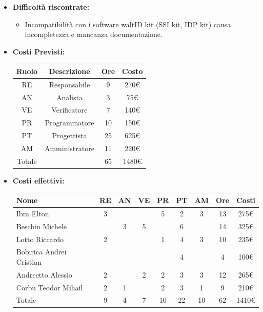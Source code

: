 \begin{itemize}
\begin{itemize}
        \end{itemize}
        \item \textbf{Difficoltà riscontrate:}
        \begin{itemize}
            \item Incompatibilità con i software waltID kit (SSI kit, IDP kit) causa incompletezza e mancanza documentazione.
        \end{itemize}
        \item \textbf{Costi Previsti:}
        \begin{longtable}{|c|c|c|c|}
            \hline
            Ruolo & Descrizione & Ore & Costo \\
            \hline
            RE & Responsabile & 9 & 270€\\
            \hline
            AN & Analista & 3 &  75€\\
            \hline
            VE & Verificatore & 7 &  140€\\
            \hline
            PR & Programmatore & 10 & 150€ \\
            \hline
            PT & Progettista & 25 &  625€\\
            \hline
            AM & Amministratore & 11 &  220€\\
            \hline
            Totale & &  65&  1480€\\
            \hline
            \end{longtable}
        \item \textbf{Costi effettivi:}
        \begin{longtable}{|p{}|c|c|c|c|c|c|c|c|}
            \hline
            Nome & RE & AN & VE & PR & PT & AM & Ore & Costi\\
            \hline
            Ibra \newline Elton &3 & & &5 &2 &3 &13 &275€ \\
            \hline
            Beschin Michele & &3 & 5& & 6& & 14& 325€\\
            \hline
            Lotto \newline Riccardo & 2& & & 1& 4& 3& 10& 235€\\
            \hline
            Bobirica Andrei Cristian & & & & &4 & &4 &100€ \\
            \hline
            Andreetto Alessio & 2& & 2& 2& 3& 3& 12& 265€\\
            \hline
            Corbu Teodor Mihail & 2& 1& & 2& 3& 1& 9& 210€\\
            \hline
            Totale &9 &4 &7 &10 &22 &10 &62 &1410€ \\
            \hline
        \end{longtable}
        \end{itemize}

